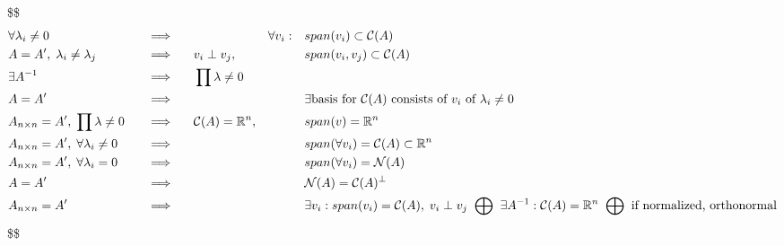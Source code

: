\documentclass[
]{book}
\theoremstyle{definition}
\theoremstyle{definition}
\theoremstyle{definition}
\theoremstyle{definition}
\theoremstyle{remark}
\begin{document}
\$\$
\begin{alignat}{3}

&\forall \lambda_i \not = 0 
&&\; \; \; \Longrightarrow \; \; \; 
&&
&& \forall v_i : 
&& span(v_i) \subset \mathcal{C}(A)

\\

&A = A', \; \lambda_i \not = \lambda_j 
&&\; \; \; \Longrightarrow \; \; \; 
&& v_i \perp v_j,
&&
&&span(v_i, v_j) \subset \mathcal{C}(A)


\\

&\exists A^{-1} 
&&\; \; \; \Longrightarrow \; \; \; 
&& \prod \lambda\not = 0
&&
&&

\\

&A = A'
&&\; \; \; \Longrightarrow \; \; \; 
&& 
&&
&&\exists \text{basis for } \mathcal{C}(A) \text{ consists of } v_i \text{ of } \lambda_i \not = 0



\\

&A_{n \times n} = A', \; \prod \lambda \not = 0 
&&\; \; \; \Longrightarrow \; \; \; 
&& \mathcal C (A)=\mathbb R^n,
&&
&&span( v) = \mathbb{R}^n



\\

&A_{n \times n} = A', \; \forall \lambda_i \not = 0 
&&\; \; \; \Longrightarrow \; \; \; 
&& 
&&
&&span(\forall v_i) = \mathcal{C}(A) \subset \mathbb{R}^n






\\

&A_{n \times n} = A', \; \forall \lambda_i  = 0 
&&\; \; \; \Longrightarrow \; \; \; 
&& 
&&
&&span(\forall v_i) = \mathcal{N}(A)

\\

&A = A'
&&\; \; \; \Longrightarrow \; \; \; 
&& 
&&
&&\mathcal{N}(A) = \mathcal C (A)^\perp

\\

&A_{n \times n} = A'
&&\; \; \; \Longrightarrow \; \; \; 
&& 
&&
&&


\exists v_i : span(v_i) = \mathcal C (A), \; v_i \perp v_j 
\; \; \tiny {\bigoplus} \; \; \normalsize \exists A^{-1} : \mathcal C(A) = \mathbb{R}^n
\; \; \tiny {\bigoplus} \; \; \normalsize \text{if normalized, orthonormal}

\end{alignat}
\$\$

  
\end{document}
